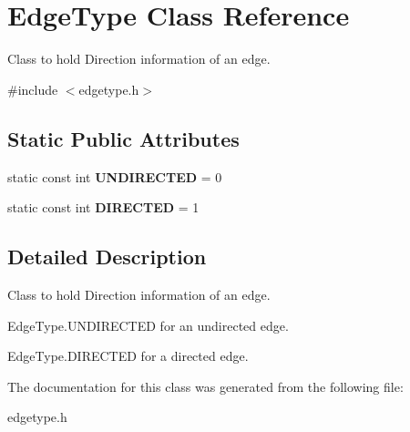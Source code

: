 \hypertarget{class_edge_type}{}\section{Edge\+Type Class Reference}
\label{class_edge_type}


Class to hold Direction information of an edge.  




{\ttfamily \#include $<$edgetype.\+h$>$}

\subsection*{Static Public Attributes}
\begin{DoxyCompactItemize}
\item 
\hypertarget{class_edge_type_a6533cc56d05c288a550b9980b66c9317}{}\label{class_edge_type_a6533cc56d05c288a550b9980b66c9317} 
static const int {\bfseries U\+N\+D\+I\+R\+E\+C\+T\+ED} = 0
\item 
\hypertarget{class_edge_type_a903017a534f2818c2d17145e4ae0321c}{}\label{class_edge_type_a903017a534f2818c2d17145e4ae0321c} 
static const int {\bfseries D\+I\+R\+E\+C\+T\+ED} = 1
\end{DoxyCompactItemize}


\subsection{Detailed Description}
Class to hold Direction information of an edge. 

Edge\+Type.\+U\+N\+D\+I\+R\+E\+C\+T\+ED for an undirected edge.

Edge\+Type.\+D\+I\+R\+E\+C\+T\+ED for a directed edge. 

The documentation for this class was generated from the following file\+:\begin{DoxyCompactItemize}
\item 
edgetype.\+h\end{DoxyCompactItemize}
